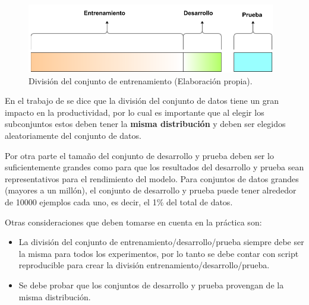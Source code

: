 \vspace{5mm} %

\begin{figure}[h!]
  \begin{center}	\includegraphics[width=0.97\textwidth,frame]{imagenes/Cap3/train-dev-test}
  \caption{Divisi\'{o}n del conjunto de entrenamiento (Elaboraci\'{o}n propia).}
  \label{fig:train-dev-test}
  \end{center}
\end{figure}

En el trabajo de  se dice que la divisi\'{o}n del conjunto de datos tiene un gran impacto en la productividad, por lo cual es importante que al elegir los subconjuntos estos deben tener la \textbf{misma distribuci\'{o}n} y deben ser elegidos aleatoriamente del conjunto de datos. 

\vspace{5mm} %

Por otra parte el tama\~{n}o del conjunto de desarrollo y prueba deben ser lo suficientemente grandes como para que los resultados del desarrollo y prueba sean representativos para el rendimiento del modelo. Para conjuntos de datos grandes (mayores a un mill\'{o}n), el conjunto de desarrollo y prueba puede tener alrededor de 10000 ejemplos cada uno, es decir, el 1\% del total de datos.

\vspace{5mm} %

Otras consideraciones que deben tomarse en cuenta en la pr\'{a}ctica son:

\begin{itemize}
\item La divisi\'{o}n del conjunto de entrenamiento/desarrollo/prueba siempre debe ser la misma para todos los experimentos, por lo tanto se debe contar con script reproducible para crear la divisi\'{o}n entrenamiento/desarrollo/prueba.
\item Se debe probar que los conjuntos de desarrollo y prueba provengan de la misma distribuci\'{o}n.
\end{itemize}

